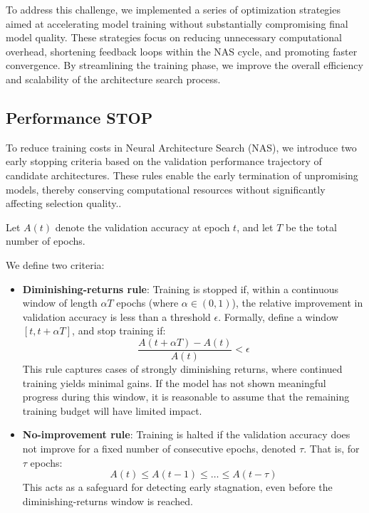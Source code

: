 To address this challenge, we implemented a series of optimization strategies aimed at accelerating model training without substantially compromising final model quality. These strategies focus on reducing unnecessary computational overhead, shortening feedback loops within the NAS cycle, and promoting faster convergence. By streamlining the training phase, we improve the overall efficiency and scalability of the architecture search process.




\subsection{Performance STOP}
\label{sec:performance_stop}
To reduce training costs in Neural Architecture Search (NAS), we introduce two early stopping criteria based on the validation performance trajectory of candidate architectures. These rules enable the early termination of unpromising models, thereby conserving computational resources without significantly affecting selection quality..

Let \( A(t) \) denote the validation accuracy at epoch \( t \), and let \( T \) be the total number of epochs.

We define two criteria:
\begin{itemize}


 \item \textbf{Diminishing-returns rule}: Training is stopped if, within a continuous window of length \( \alpha T \) epochs (where \( \alpha \in (0,1) \)), the relative improvement in validation accuracy is less than a threshold \( \epsilon \). Formally, define a window \( [t, t+\alpha T] \), and stop training if:
  \[
  \frac{A(t+\alpha T) - A(t)}{A(t)} < \epsilon
  \]
  This rule captures cases of strongly diminishing returns, where continued training yields minimal gains. If the model has not shown meaningful progress during this window, it is reasonable to assume that the remaining training budget will have limited impact.

   \item \textbf{No-improvement rule}: Training is halted if the validation accuracy does not improve for a fixed number of consecutive epochs, denoted \( \tau \). That is, for \( \tau \) epochs:
  \[
  A(t) \leq A(t-1) \leq \dots \leq A(t-\tau)
  \]
  This acts as a safeguard for detecting early stagnation, even before the diminishing-returns window is reached.

\end{itemize}


